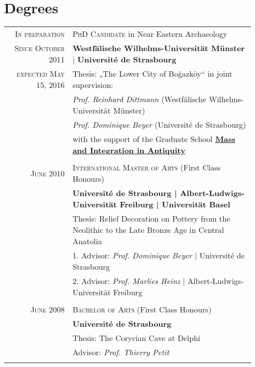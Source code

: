 \section{Degrees}

\begin{tabular}{r|p{13cm}}

\textsc{In preparation}  &	 \textsc{PhD Candidate} in Near Eastern Archaeology \\
\textsc{Since October 2011 }& \textbf{Westfälische Wilhelms-Universität Münster} | \textbf{Université de Strasbourg} \\
\textsc{expected May  15, 2016} & \small Thesis: {\normalsize{„The Lower City of Bo\u{g}azköy“}} \small in  joint supervision:\\
&  \small \hspace{0.5cm} \emph{Prof.  Reinhard Dittmann}  \small{(Westfälische Wilhelms-Universität Münster)} \\
&  \small \hspace{0.5cm} \emph{Prof.  Dominique Beyer} (\small{Université de Strasbourg)}\\
& \footnotesize{with the support of the Graduate School} \footnotesize{\href{http://www.fisa-miag.eu/}{\textbf{Mass and Integration in Antiquity}}} \\
\multicolumn{2}{c}{} \\

\textsc{June} 2010 & \textsc{International Master of Arts} \small {(First Class Honours)}\\
& \textbf{Université de Strasbourg | Albert-Ludwigs-Universität Freiburg | Universität Basel} \\ 
& Thesis: Relief Decoration on Pottery from the Neolithic to the Late Bronze Age in Central Anatolia \\
& \small 1. Advisor: \emph{Prof. Dominique Beyer} | \small{Université de Strasbourg}  \\ 
& \small 2. Advisor: \emph{Prof. Marlies Heinz} | \small{Albert-Ludwigs-Universität Freiburg} \\
\multicolumn{2}{c}{} \\

\textsc{June} 2008 & \textsc{Bachelor of Arts} \small {(First Class Honours)}\\
& \textbf{Université de Strasbourg} \\ 
& Thesis: The Corycian Cave at Delphi \\
& \small Advisor: \emph{Prof.  Thierry Petit} \\
\multicolumn{2}{c}{} \\
\end{tabular}

